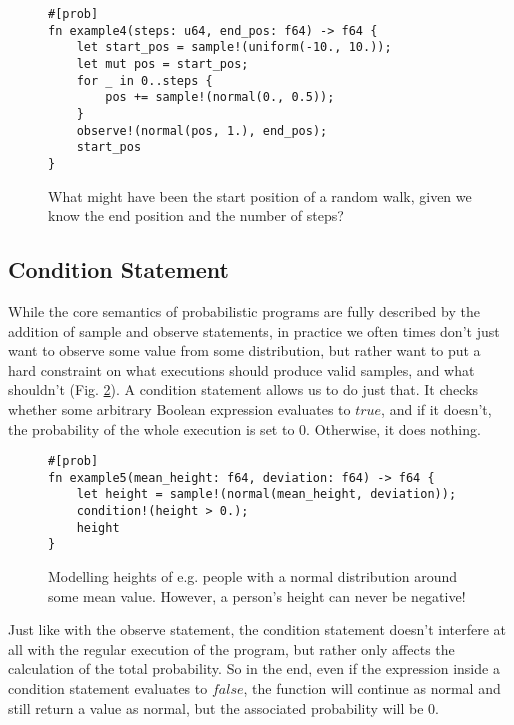 \begin{figure}[h]
\begin{lstlisting}
#[prob]
fn example4(steps: u64, end_pos: f64) -> f64 {
    let start_pos = sample!(uniform(-10., 10.));
    let mut pos = start_pos;
    for _ in 0..steps {
        pos += sample!(normal(0., 0.5));
    }
    observe!(normal(pos, 1.), end_pos);
    start_pos
}
\end{lstlisting}
\caption{What might have been the start position of a random walk, given we know the end position and the number of steps?}
\label{example4}
\end{figure}


\subsection{Condition Statement}

While the core semantics of probabilistic programs are fully described by the addition of sample and observe statements, in practice we often times don't just want to observe some value from some distribution, but rather want to put a hard constraint on what executions should produce valid samples, and what shouldn't (Fig. \ref{example5}). A condition statement allows us to do just that. It checks whether some arbitrary Boolean expression evaluates to $true$, and if it doesn't, the probability of the whole execution is set to $0$. Otherwise, it does nothing.

\begin{figure}[h]
\begin{lstlisting}
#[prob]
fn example5(mean_height: f64, deviation: f64) -> f64 {
    let height = sample!(normal(mean_height, deviation));
    condition!(height > 0.);
    height
}
\end{lstlisting}
\caption{Modelling heights of e.g. people with a normal distribution around some mean value. However, a person's height can never be negative!}
\label{example5}
\end{figure}

Just like with the observe statement, the condition statement doesn't interfere at all with the regular execution of the program, but rather only affects the calculation of the total probability. So in the end, even if the expression inside a condition statement evaluates to $false$, the function will continue as normal and still return a value as normal, but the associated probability will be $0$.

